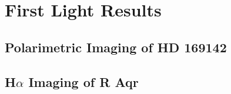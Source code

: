 \section{First Light Results}\label{sec:firstlight}

\subsection{Polarimetric Imaging of HD 169142\label{sec:hd169142}}

\subsection{H$\alpha$ Imaging of R Aqr\label{sec:raqr}}
